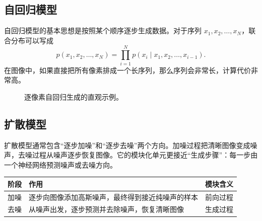 \documentclass[UTF8,11pt,a4paper]{ctexart}
\begin{document}
\subsection{自回归模型}

自回归模型的基本思想是按照某个顺序逐步生成数据。对于序列 $x_1,x_2,\ldots,x_N$，联合分布可以写成
\begin{equation}
    p(x_1,x_2,\ldots,x_N)=\prod_{i=1}^{N}p(x_i\mid x_1,x_2,\ldots,x_{i-1}).
\end{equation}
在图像中，如果直接把所有像素排成一个长序列，那么序列会非常长，计算代价非常高。

\begin{figure}[H]
\centering
{}
\caption{逐像素自回归生成的直观示例。}
\end{figure}

\subsection{扩散模型}

扩散模型通常包含“逐步加噪”和“逐步去噪”两个方向。加噪过程把清晰图像变成噪声，去噪过程从噪声逐步恢复图像。它的模块化单元更接近“生成步骤”：每一步由一个神经网络预测噪声或去噪方向。

\begin{center}
\begin{tabularx}{0.86\linewidth}{cXc}
\toprule
阶段 & 作用 & 模块含义\\
\midrule
加噪 & 逐步向图像添加高斯噪声，最终得到接近纯噪声的样本 & 前向过程\\
去噪 & 从噪声出发，逐步预测并去除噪声，恢复清晰图像 & 生成过程\\
\bottomrule
\end{tabularx}
\end{center}
\end{document}
